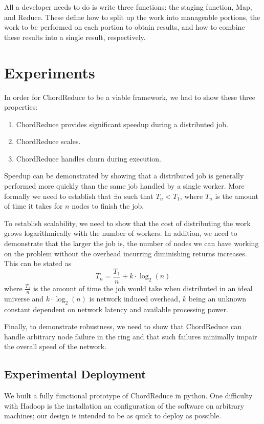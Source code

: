 \documentclass[10pt, conference, compsocconf]{IEEEtran}
\begin{document}
All a developer needs to do is write three functions: the staging function, Map, and Reduce.  These define how to split up the work into manageable portions, the work to be performed on each portion to obtain results, and how to combine these results into a single result, respectively. 



\section{Experiments}

In order for ChordReduce to be a viable framework, we had to show these three properties:
\begin{enumerate}
    \item ChordReduce provides significant speedup during a distributed job.
    \item ChordReduce scales.
    \item ChordReduce handles churn during execution.
\end{enumerate}
Speedup can be demonstrated by showing that a distributed job is generally performed more quickly than the same job handled by a single worker.  More formally we need to establish that $\exists n$ such that $T_{n} < T_{1}$, where $T_{n}$ is the amount of time it takes for $n$ nodes to finish the job.

To establish scalability, we need to show that the cost of distributing the work grows logarithmically with the number of workers.  In addition, we need to demonstrate that the larger the job is, the number of nodes we can have working on the problem without the overhead incurring diminishing returns increases. This can be stated as $$T_{n} = \frac{T_{1}}{n} + k \cdot \log_{2}(n)$$ where $\frac{T_{1}}{n}$ is the amount of time the job would take when distributed in an ideal universe and $k \cdot \log_{2}(n)$ is network induced overhead, $k$ being an unknown constant dependent on network latency and available processing power.

Finally, to demonstrate robustness, we need to show that ChordReduce can handle arbitrary node failure in the ring and that such failures minimally impair the overall speed of the network.

\subsection{Experimental Deployment}
We built a fully functional prototype of ChordReduce in python.  One difficulty with Hadoop is the installation an configuration of the software on arbitrary machines;  our design is intended to be as quick to deploy as possible. 
\end{document}
